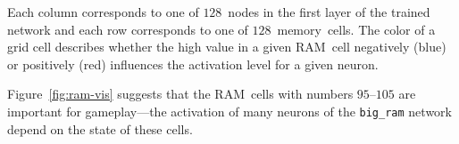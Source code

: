 Each column corresponds to one of $128$~nodes in the first layer of the trained network and each row corresponds to one of $128$~memory~cells. The color of a grid cell describes whether the high value in a given RAM~cell negatively (blue) or positively (red) influences the activation level for a given neuron.

Figure~\ref{fig:ram-vis} suggests that the RAM~cells with numbers $95$--$105$ are important for gameplay---the activation of many neurons of the \texttt{big\_ram} network depend on the state of these cells.
